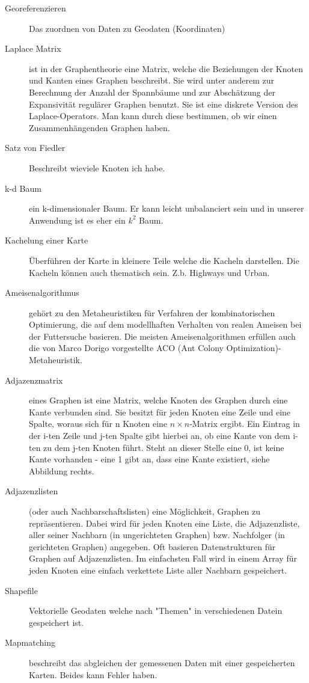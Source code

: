 \begin{description}
    \item [Georeferenzieren] Das zuordnen von Daten zu Geodaten (Koordinaten)
    \item[Laplace Matrix] ist in der Graphentheorie eine Matrix, welche die Beziehungen der Knoten und Kanten eines
    Graphen beschreibt.
    Sie wird unter anderem zur Berechnung der Anzahl der Spannbäume und zur Abschätzung der
    Expansivität regulärer Graphen benutzt.
    Sie ist eine diskrete Version des Laplace-Operators. Man kann durch diese
    bestimmen, ob wir einen Zusammenhängenden Graphen haben.
    \item[Satz von Fiedler] Beschreibt wieviele Knoten ich habe.
    \item[k-d Baum] ein k-dimensionaler Baum.
    Er kann leicht unbalanciert sein und in unserer Anwendung ist es eher
    ein $k^{2}$ Baum.
    \item[Kachelung einer Karte] Überführen der Karte in kleinere Teile welche die Kacheln darstellen. Die Kacheln
    können auch thematisch sein. Z.b. Highways und Urban.
    \item[Ameisenalgorithmus] gehört zu den Metaheuristiken für Verfahren der kombinatorischen Optimierung, die auf dem
    modellhaften Verhalten von realen Ameisen bei der Futtersuche basieren.
    Die meisten Ameisenalgorithmen erfüllen
    auch die von Marco Dorigo vorgestellte ACO (Ant Colony Optimization)-Metaheuristik.
    \item[Adjazenzmatrix] eines Graphen ist eine Matrix, welche Knoten des Graphen durch eine Kante verbunden sind.
    Sie besitzt für jeden Knoten eine Zeile und eine Spalte, woraus sich für n Knoten eine $n\times n$-Matrix ergibt.
    Ein Eintrag in der i-ten Zeile und j-ten Spalte gibt hierbei an, ob eine Kante von dem i-ten zu dem j-ten Knoten führt.
    Steht an dieser Stelle eine 0, ist keine Kante vorhanden - eine 1 gibt an, dass eine Kante existiert, siehe Abbildung rechts.
    \item[Adjazenzlisten] (oder auch Nachbarschaftslisten) eine Möglichkeit, Graphen zu repräsentieren.
    Dabei wird für jeden Knoten eine Liste, die Adjazenzliste, aller seiner Nachbarn (in ungerichteten Graphen) bzw.
    Nachfolger (in gerichteten Graphen) angegeben.
    Oft basieren Datenstrukturen für Graphen auf Adjazenzlisten.
    Im einfachsten Fall wird in einem Array für jeden Knoten eine einfach verkettete Liste aller Nachbarn gespeichert.
    \item[Shapefile] Vektorielle Geodaten welche nach "Themen" in verschiedenen Datein gespeichert ist.
    \item[Mapmatching] beschreibt das abgleichen der gemessenen Daten mit einer gespeicherten Karten.
    Beides kann Fehler haben.
\end{description}


